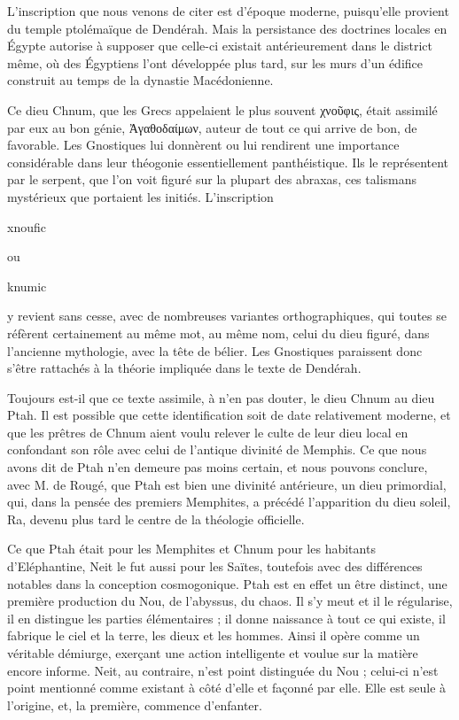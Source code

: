 \documentclass[letterpaper,twocolumn,openany,nodeprecatedcode]{dndbook}
\begin{document}
L'inscription que nous venons de citer est d'époque moderne, puisqu'elle provient du temple ptolémaïque de Dendérah. Mais la persistance des doctrines locales en Égypte autorise à supposer que celle-ci existait antérieurement dans le district même, où des Égyptiens l'ont développée plus tard, sur les murs d'un édifice construit au temps de la dynastie Macédonienne.

Ce dieu Chnum, que les Grecs appelaient le plus souvent χνοῦφις, était assimilé par eux au bon génie, Ἀγαθοδαίμων, auteur de tout ce qui arrive de bon, de favorable. Les Gnostiques lui donnèrent ou lui rendirent une importance considérable dans leur théogonie essentiellement panthéistique. Ils le représentent par le serpent, que l'on voit figuré sur la plupart des abraxas, ces talismans mystérieux que portaient les initiés. L'inscription \begin{coptic}xnoufic\end{coptic} ou \begin{coptic}knumic\end{coptic} y revient sans cesse, avec de nombreuses variantes orthographiques, qui toutes se réfèrent certainement au même mot, au même nom, celui du dieu figuré, dans l'ancienne mythologie, avec la tête de bélier. Les Gnostiques paraissent donc s'être rattachés à la théorie impliquée dans le texte de Dendérah.

Toujours est-il que ce texte assimile, à n'en pas douter, le dieu Chnum au dieu Ptah. Il est possible que cette identification soit de date relativement moderne, et que les prêtres de Chnum aient voulu relever le culte de leur dieu local en confondant son rôle avec celui de l'antique divinité de Memphis. Ce que nous avons dit de Ptah n'en demeure pas moins certain, et nous pouvons conclure, avec M. de Rougé, que Ptah est bien une divinité antérieure, un dieu primordial, qui, dans la pensée des premiers Memphites, a précédé l'apparition du dieu soleil, Ra, devenu plus tard le centre de la théologie officielle.

Ce que Ptah était pour les Memphites et Chnum pour les habitants d'Eléphantine, Neit le fut aussi pour les Saïtes, toutefois avec des différences notables dans la conception cosmogonique. Ptah est en effet un être distinct, une première production du Nou, de l'abyssus, du chaos. Il s'y meut et il le régularise, il en distingue les parties élémentaires ; il donne naissance à tout ce qui existe, il fabrique le ciel et la terre, les dieux et les hommes. Ainsi il opère comme un véritable démiurge, exerçant une action intelligente et voulue sur la matière encore informe. Neit, au contraire, n'est point distinguée du Nou ; celui-ci n'est point mentionné comme existant à côté d'elle et façonné par elle. Elle est seule à l'origine, et, la première, commence d'enfanter.
\end{document}
